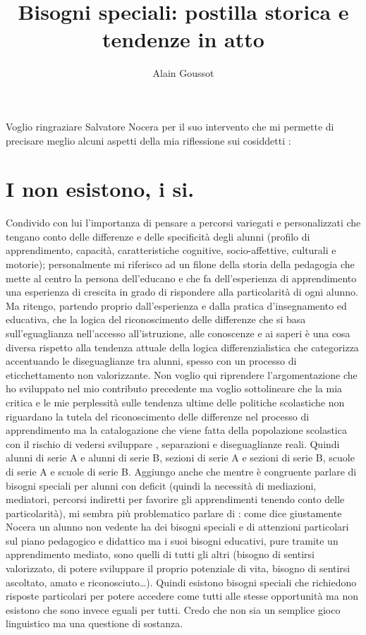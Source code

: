 \author{Alain Goussot}
\title{Bisogni speciali: postilla storica e tendenze in atto}
\label{cha:Goussot010813}
\maketitle
{}
Voglio ringraziare Salvatore Nocera\pageref{cha:nocera300713} per il suo intervento che mi permette di precisare meglio alcuni aspetti della mia riflessione sui cosiddetti :
\section*{I  non esistono, i  si.}
Condivido con lui l'importanza di pensare a percorsi variegati e personalizzati che tengano conto delle differenze e delle specificità degli alunni (profilo di apprendimento, capacità, caratteristiche cognitive, socio-affettive, culturali e motorie); personalmente mi riferisco ad un filone della storia della pedagogia che mette al centro la persona dell'educano e che fa dell'esperienza di apprendimento una esperienza di crescita in grado di rispondere alla particolarità di ogni alunno. Ma ritengo, partendo proprio dall'esperienza e dalla pratica d'insegnamento ed educativa, che la logica del riconoscimento delle differenze che si basa sull'eguaglianza nell'accesso all'istruzione, alle conoscenze e ai saperi è una cosa diversa rispetto alla tendenza attuale della logica differenzialistica che categorizza accentuando le diseguaglianze tra alunni, spesso con un processo di eticchettamento non valorizzante. Non voglio qui riprendere l'argomentazione che ho sviluppato nel mio contributo precedente ma voglio sottolineare che la mia critica e le mie perplessità sulle tendenza ultime delle politiche scolastiche non riguardano la tutela del riconoscimento delle differenze nel processo di apprendimento ma la catalogazione che viene fatta della popolazione scolastica con il rischio di vedersi sviluppare , separazioni e diseguaglianze reali. Quindi alunni di serie A e alunni di serie B, sezioni di serie A e sezioni di serie B, scuole di serie A e scuole di serie B. Aggiungo anche che mentre è congruente parlare di bisogni speciali per alunni con deficit (quindi la necessità di mediazioni, mediatori, percorsi indiretti per favorire gli apprendimenti tenendo conto delle particolarità), mi sembra più problematico parlare di : come dice giustamente Nocera un alunno non vedente ha dei bisogni speciali e di attenzioni particolari sul piano pedagogico e didattico ma i suoi bisogni educativi, pure tramite un apprendimento mediato, sono quelli di tutti gli altri (bisogno di sentirsi valorizzato, di potere sviluppare il proprio potenziale di vita, bisogno di sentirsi ascoltato, amato e riconosciuto\dots). Quindi esistono bisogni speciali che richiedono risposte particolari per potere accedere come tutti alle stesse opportunità ma non esistono  che sono invece eguali per tutti. Credo che non sia un semplice gioco linguistico ma una questione di sostanza.
